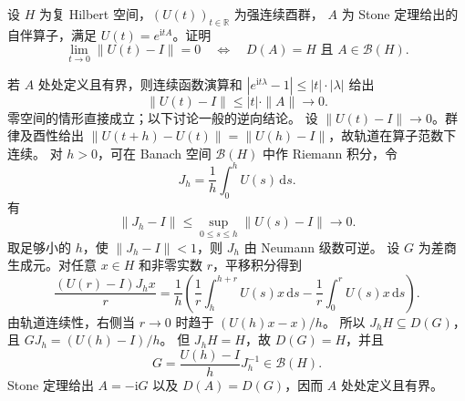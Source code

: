 \begin{optionalexercise}\label{b1:ex:29-norm-continuous-group}
设 \(H\) 为复 Hilbert 空间，\((U(t))_{t\in\mathbb R}\) 为强连续酉群，
\(A\) 为 Stone 定理给出的自伴算子，满足 \(U(t)=e^{\mathrm itA}\)。证明
\[
 \lim_{t\to0}\|U(t)-I\|=0
 \quad\Longleftrightarrow\quad
 D(A)=H\text{ 且 }A\in\mathcal B(H).
\]
\end{optionalexercise}
\begin{solution}
若 \(A\) 处处定义且有界，则连续函数演算和
\(|e^{\mathrm it\lambda}-1|\leq |t|\cdot|\lambda|\) 给出
\[
 \|U(t)-I\|\leq |t|\cdot\|A\|\longrightarrow0.
\]
零空间的情形直接成立；以下讨论一般的逆向结论。
设 \(\|U(t)-I\|\to0\)。群律及酉性给出
\(\|U(t+h)-U(t)\|=\|U(h)-I\|\)，故轨道在算子范数下连续。
对 \(h>0\)，可在 Banach 空间 \(\mathcal B(H)\) 中作 Riemann 积分，令
\[
 J_h=\frac1h\int_0^h U(s)\,\mathrm ds.
\]
有
\[
 \|J_h-I\|\leq\sup_{0\leq s\leq h}\|U(s)-I\|\longrightarrow0.
\]
取足够小的 \(h\)，使 \(\|J_h-I\|<1\)，则 \(J_h\) 由 Neumann 级数可逆。
设 \(G\) 为差商生成元。对任意 \(x\in H\) 和非零实数 \(r\)，平移积分得到
\[
 \frac{(U(r)-I)J_hx}{r}
 =\frac1h\left(\frac1r\int_h^{h+r}U(s)x\,\mathrm ds
       -\frac1r\int_0^rU(s)x\,\mathrm ds\right).
\]
由轨道连续性，右侧当 \(r\to0\) 时趋于 \((U(h)x-x)/h\)。
所以 \(J_hH\subseteq D(G)\)，且 \(GJ_h=(U(h)-I)/h\)。
但 \(J_hH=H\)，故 \(D(G)=H\)，并且
\[
 G=\frac{U(h)-I}{h}J_h^{-1}\in\mathcal B(H).
\]
Stone 定理给出 \(A=-\mathrm iG\) 以及 \(D(A)=D(G)\)，因而 \(A\) 处处定义且有界。
\end{solution}
